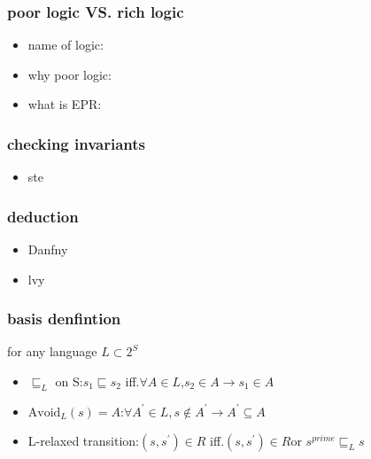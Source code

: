 \begin{frame}
    \frametitle{poor logic VS. rich logic}
    \begin{itemize}
        \item name of logic:
        \item why poor logic:
        \item what is EPR:



    \end{itemize}
\end{frame}
\begin{frame}
    \frametitle{checking invariants}
    \begin{itemize}
        \item ste
    \end{itemize}
\end{frame}
\begin{frame}
    \frametitle{deduction}
    \begin{itemize}
        \item Danfny
        \item lvy
    \end{itemize}
\end{frame}

\begin{frame}
    \frametitle{basis denfintion}
    for any language $L\subset 2^{S}$
    \begin{itemize}
        \item $\sqsubseteq_{L}$ on S:$s_{1}\sqsubseteq s_{2}$ iff.$\forall A\in L$,$s_{2}\in A\rightarrow s_{1}\in A$
        \item $\text{Avoid}_{L}(s)=A$:$\forall A^{\prime}\in L, s\notin A^{\prime}\rightarrow A^{\prime}\subseteq A$
        \item L-relaxed transition:$(s,s^{\prime})\in R$ iff.$(s,s^{\prime})\in R$or $s^{prime}\sqsubseteq_{L}s$
    \end{itemize}
\end{frame}